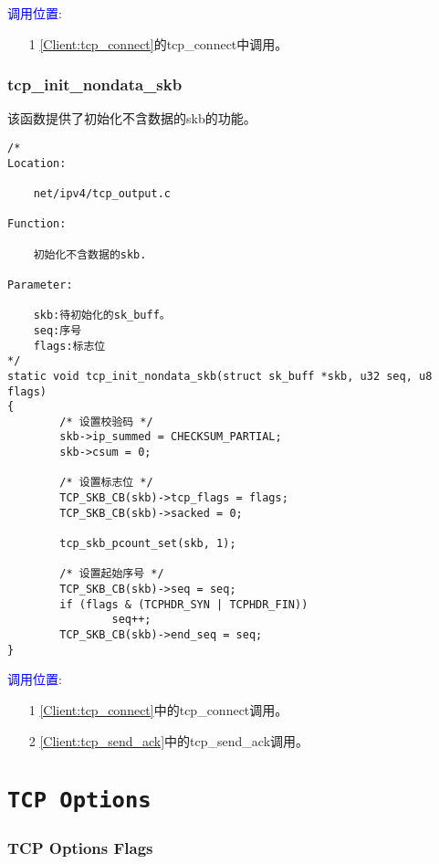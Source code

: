         \textcolor{blue}{调用位置}:

            \begin{enumerate}
            \item[1]        \ref{Client:tcp_connect}的tcp\_connect中调用。
            \end{enumerate}
        \subsubsection{tcp\_init\_nondata\_skb}
            \label{TCPInitialize:tcp_init_nondata_skb}
            该函数提供了初始化不含数据的skb的功能。
\begin{verbatim}
/*
Location:

    net/ipv4/tcp_output.c
    
Function:

    初始化不含数据的skb.

Parameter:

    skb:待初始化的sk_buff。
    seq:序号
    flags:标志位
*/
static void tcp_init_nondata_skb(struct sk_buff *skb, u32 seq, u8 flags)
{
        /* 设置校验码 */
        skb->ip_summed = CHECKSUM_PARTIAL;
        skb->csum = 0;

        /* 设置标志位 */
        TCP_SKB_CB(skb)->tcp_flags = flags;
        TCP_SKB_CB(skb)->sacked = 0;

        tcp_skb_pcount_set(skb, 1);

        /* 设置起始序号 */
        TCP_SKB_CB(skb)->seq = seq;
        if (flags & (TCPHDR_SYN | TCPHDR_FIN))
                seq++;
        TCP_SKB_CB(skb)->end_seq = seq;
}
\end{verbatim}

        \textcolor{blue}{调用位置}:

            \begin{enumerate}
                \item[1]        \ref{Client:tcp_connect}中的tcp\_connect调用。
                \item[2]        \ref{Client:tcp_send_ack}中的tcp\_send\_ack调用。
            \end{enumerate}

\section{\texttt{TCP Options}}
        \subsubsection{TCP Options Flags}

